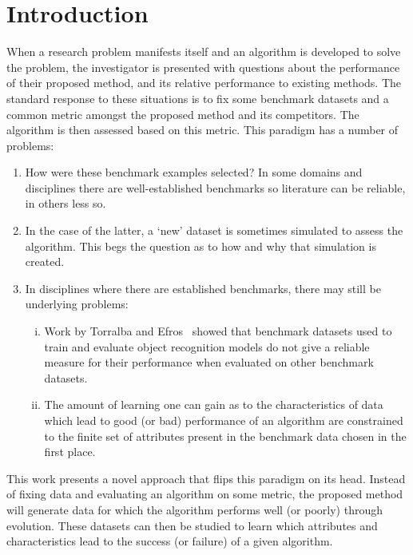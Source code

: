 \section{Introduction}\label{section:introduction}

When a research problem manifests itself and an algorithm is developed to solve
the problem, the investigator is presented with questions about the performance
of their proposed method, and its relative performance to existing methods. The
standard response to these situations is to fix some benchmark datasets and a
common metric amongst the proposed method and its competitors. The algorithm is
then assessed based on this metric. This paradigm has a number of problems:

\begin{enumerate}
    \item How were these benchmark examples selected? In some domains and
        disciplines there are well-established benchmarks so literature can be
        reliable, in others less so.
    \item In the case of the latter, a `new' dataset is sometimes simulated to
        assess the algorithm. This begs the question as to how and why that
        simulation is created.
    \item In disciplines where there are established benchmarks, there may still
        be underlying problems:
        \begin{enumerate}[(i)]
            \item Work by Torralba and Efros~\cite{Torralba2011} showed that
                benchmark datasets used to train and evaluate object recognition
                models do not give a reliable measure for their performance when
                evaluated on other benchmark datasets.
            \item The amount of learning one can gain as to the characteristics
                of data which lead to good (or bad) performance of an algorithm
                are constrained to the finite set of attributes present in the
                benchmark data chosen in the first place.
    \end{enumerate}
\end{enumerate}

This work presents a novel approach that flips this paradigm on its head.
Instead of fixing data and evaluating an algorithm on some metric, the proposed
method will generate data for which the algorithm performs well (or poorly)
through evolution. These datasets can then be studied to learn which attributes
and characteristics lead to the success (or failure) of a given algorithm.

